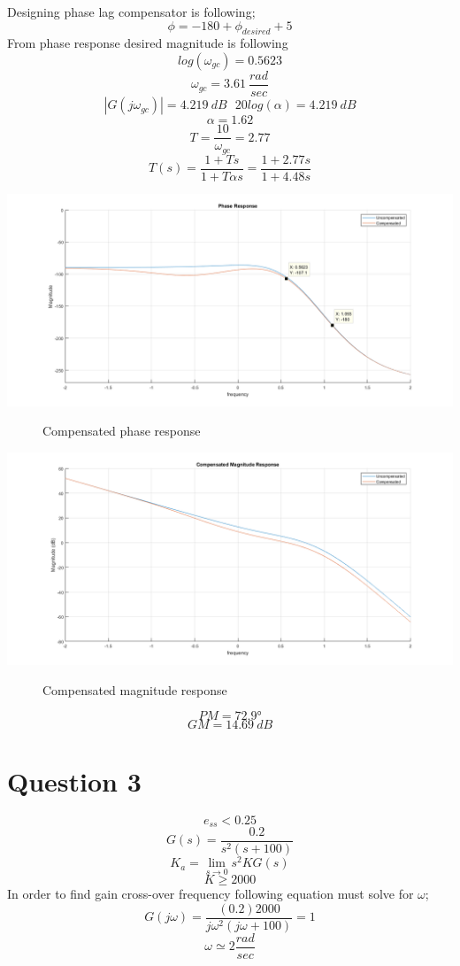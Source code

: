 \documentclass[11pt]{report}
\begin{document}
Designing phase lag compensator is following;
\[\phi=-180+\phi_{desired}+5\]
From phase response desired magnitude is following
\[log(\omega_{gc})=0.5623\]
\[\omega_{gc}=3.61 \> \frac{rad}{sec}\]
\[|G(j\omega_{gc})|=4.219 \> dB \>\>\> 20log(\alpha)=4.219\> dB\]
\[\alpha=1.62\]
\[T = \frac{10}{\omega_{gc}}=2.77\]
\[T(s)=\frac{1+Ts}{1+T\alpha s} = \frac{1+2.77s}{1+4.48s}\]

\includegraphics[scale=0.55, center]{companset}
\begin{figure}[H]
\caption{Compensated phase response}
\label{fig:zero}
\end{figure}

\includegraphics[scale=0.55, center]{commag}
\begin{figure}[H]
\caption{Compensated magnitude response}
\label{fig:zero}
\end{figure}

\[PM=\ang{72.9}\]
\[GM=14.69 \> dB\]
\section*{Question 3}
\[e_{ss}<0.25\]
\[G(s)=\frac{0.2}{s^2(s+100)}\]
\[K_a = \lim_{s\to 0} s^2 K G(s)\]
\[K \geq 2000\]
In order to find gain cross-over frequency following equation must solve for $\omega$;
\[G(j\omega)=\frac{(0.2)2000}{j\omega^2(j\omega+100)}=1\]
\[\omega \simeq 2 \frac{rad}{sec}\]
\end{document}
